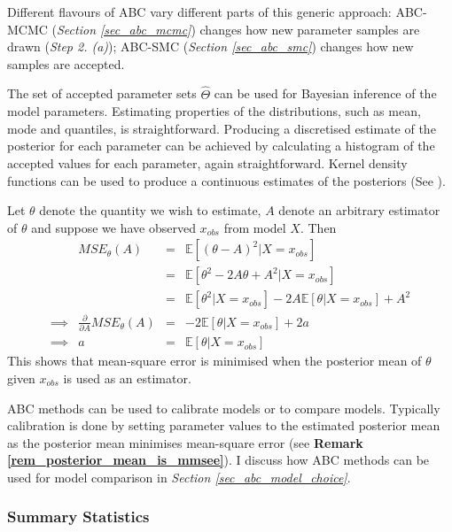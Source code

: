 \documentclass[bibliography=totoc,11pt,a4paper,margin=0]{article}
\newcommand*{\expect}{\mathbb{E}}
\theoremstyle{break}
\begin{document}
  \par Different flavours of ABC vary different parts of this generic approach: ABC-MCMC (\textit{Section \ref{sec_abc_mcmc}}) changes how new parameter samples are drawn (\textit{Step 2. (a)}); ABC-SMC (\textit{Section \ref{sec_abc_smc}}) changes how new samples are accepted.

  \par The set of accepted parameter sets $\hat\Theta$ can be used for Bayesian inference of the model parameters. Estimating properties of the distributions, such as mean, mode and quantiles, is straightforward. Producing a discretised estimate of the posterior for each parameter can be achieved by calculating a histogram of the accepted values for each parameter, again straightforward. Kernel density functions can be used to produce a continuous estimates of the posteriors (See \cite[]{review_of_kde}).

  \begin{box_remark}\label{rem_posterior_mean_is_mmsee}
    Let $\theta$ denote the quantity we wish to estimate, $A$ denote an arbitrary estimator of $\theta$ and suppose we have observed $x_{obs}$ from model $X$. Then
    \[\begin{array}{rrcl}
      &MSE_\theta(A)&=&\expect\left[(\theta-A)^2|X=x_{obs}\right]\\
      &&=&\expect\left[\theta^2-2A\theta+A^2|X=x_{obs}\right]\\
      &&=&\expect\left[\theta^2|X=x_{obs}\right]-2A\expect\left[\theta|X=x_{obs}\right]+A^2\\
      \implies&\frac{\partial}{\partial A}MSE_\theta(A)&=&-2\expect[\theta|X=x_{obs}]+2a\\
      \implies&a&=&\expect[\theta|X=x_{obs}]
    \end{array}\]
    This shows that mean-square error is minimised when the posterior mean of $\theta$ given $x_{obs}$ is used as an estimator.
  \end{box_remark}

  \par ABC methods can be used to calibrate models or to compare models. Typically calibration is done by setting parameter values to the estimated posterior mean as the posterior mean minimises mean-square error (see \textbf{Remark \ref{rem_posterior_mean_is_mmsee}}). I discuss how ABC methods can be used for model comparison in \textit{Section \ref{sec_abc_model_choice}}.

\subsubsection*{Summary Statistics}
\end{document}

